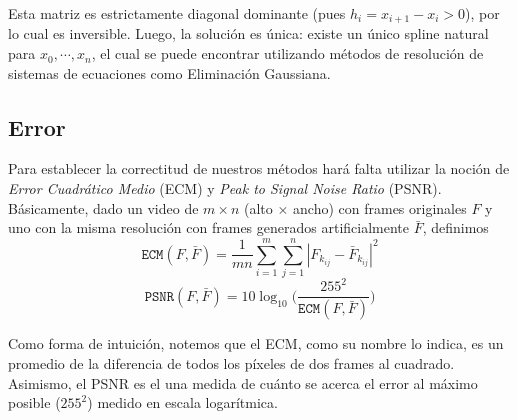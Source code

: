 Esta matriz es estrictamente diagonal dominante (pues $h_i = x_{i + 1} - x_i > 0$), por lo cual es inversible\cite{properties_of_diagonally_dominant_matrix}. Luego, la solución es única: existe un único spline natural para $x_0, \cdots, x_n$, el cual se puede encontrar utilizando métodos de resolución de sistemas de ecuaciones como Eliminación Gaussiana\cite{TP1}.

\subsection{Error}
Para establecer la correctitud de nuestros métodos hará falta utilizar la noción de \emph{Error Cuadr\'atico Medio} (ECM) y \emph{Peak to Signal Noise Ratio} (PSNR). Básicamente, dado un video de $m \times n$ (alto $\times$ ancho) con frames originales $F$ y uno con la misma resolución con frames generados artificialmente $\bar{F}$, definimos  
$$\texttt{ECM}(F,\bar{F}) = \frac{1}{mn}\sum_{i=1}^m\sum_{j = 1}^n |F_{k_{ij}} - \bar{F}_{k_{ij}}|^2$$
$$\texttt{PSNR}(F,\bar{F}) = 10 \log_{10}\bigg(\frac{255^2}{\texttt{ECM}(F,\bar{F})}\bigg)$$

Como forma de intuición, notemos que el ECM, como su nombre lo indica, es un promedio de la diferencia de todos los píxeles de dos frames al cuadrado. Asimismo, el PSNR es el una medida de cuánto se acerca el error al máximo posible ($255^2$) medido en escala logarítmica.
